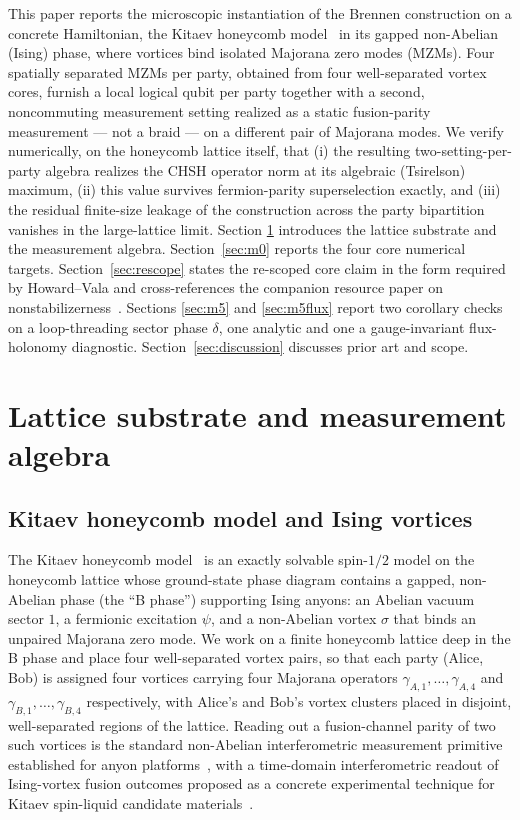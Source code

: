 \documentclass[aps,pra,twocolumn,superscriptaddress,floatfix,nofootinbib]{revtex4-2}
\begin{document}
This paper reports the microscopic instantiation of the Brennen
construction on a concrete Hamiltonian, the Kitaev honeycomb
model~\cite{Kitaev2003,Kitaev2006} in its gapped non-Abelian (Ising)
phase, where vortices bind isolated Majorana zero modes (MZMs).
Four spatially separated MZMs per party, obtained from four
well-separated vortex cores, furnish a local logical qubit per party
together with a second, noncommuting measurement setting realized as a
static fusion-parity measurement --- not a braid --- on a different
pair of Majorana modes. We verify numerically, on the honeycomb
lattice itself, that (i) the resulting two-setting-per-party algebra
realizes the CHSH operator norm at its algebraic (Tsirelson) maximum,
(ii) this value survives fermion-parity superselection exactly, and
(iii) the residual finite-size leakage of the construction across the
party bipartition vanishes in the large-lattice limit. Section
\ref{sec:setup} introduces the lattice substrate and the measurement
algebra. Section~\ref{sec:m0} reports the four core numerical targets.
Section~\ref{sec:rescope} states the re-scoped core claim in the form
required by Howard--Vala and cross-references the companion resource
paper on nonstabilizerness~\cite{Sayim2026magic}. Sections
\ref{sec:m5} and \ref{sec:m5flux} report two corollary checks on a
loop-threading sector phase $\delta$, one analytic and one a
gauge-invariant flux-holonomy diagnostic. Section~\ref{sec:discussion}
discusses prior art and scope.

\section{Lattice substrate and measurement algebra}
\label{sec:setup}

\subsection{Kitaev honeycomb model and Ising vortices}

The Kitaev honeycomb model~\cite{Kitaev2006} is an exactly solvable
spin-$1/2$ model on the honeycomb lattice whose ground-state phase
diagram contains a gapped, non-Abelian phase (the ``B phase'')
supporting Ising anyons: an Abelian vacuum sector $1$, a fermionic
excitation $\psi$, and a non-Abelian vortex $\sigma$ that binds an
unpaired Majorana zero mode. We work on a finite honeycomb lattice
deep in the B phase and place four well-separated vortex pairs, so
that each party (Alice, Bob) is assigned four vortices carrying four
Majorana operators $\gamma_{A,1},\ldots,\gamma_{A,4}$ and
$\gamma_{B,1},\ldots,\gamma_{B,4}$ respectively, with Alice's and
Bob's vortex clusters placed in disjoint, well-separated regions of
the lattice. Reading out a fusion-channel parity of two such vortices
is the standard non-Abelian interferometric measurement primitive
established for anyon platforms~\cite{BondersonShtengelSlingerland2008}, with
a time-domain interferometric readout of Ising-vortex fusion outcomes
proposed as a concrete experimental technique for Kitaev
spin-liquid candidate materials~\cite{Klocke2021}.
\end{document}
